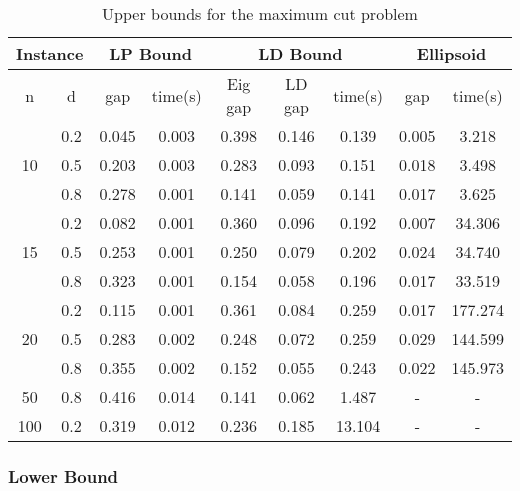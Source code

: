 \documentclass[12pt]{article}
\theoremstyle{plain}
\theoremstyle{definition}
\begin{document}
\begin{table}[h]
	\small
	\centering
	\begin{tabular}{cc|cc|ccc|cc}
		\hline
		\multicolumn{2}{c|}{Instance} & \multicolumn{2}{c|}{LP Bound} & \multicolumn{3}{c|}{LD Bound} & \multicolumn{2}{c}{Ellipsoid} \\ \hline
		n                     & d     & gap          & time(s)        & Eig gap  & LD gap  & time(s)  & gap          & time(s)        \\ \hline
		\multirow{3}{*}{10}   & 0.2   & 0.045        & 0.003          & 0.398    & 0.146   & 0.139    & 0.005        & 3.218          \\
		& 0.5   & 0.203        & 0.003          & 0.283    & 0.093   & 0.151    & 0.018        & 3.498          \\
		& 0.8   & 0.278        & 0.001          & 0.141    & 0.059   & 0.141    & 0.017        & 3.625          \\ \hline
		\multirow{3}{*}{15}   & 0.2   & 0.082        & 0.001          & 0.360    & 0.096   & 0.192    & 0.007        & 34.306         \\
		& 0.5   & 0.253        & 0.001          & 0.250    & 0.079   & 0.202    & 0.024        & 34.740         \\
		& 0.8   & 0.323        & 0.001          & 0.154    & 0.058   & 0.196    & 0.017        & 33.519         \\ \hline
		\multirow{3}{*}{20}   & 0.2   & 0.115        & 0.001          & 0.361    & 0.084   & 0.259    & 0.017        & 177.274        \\
		& 0.5   & 0.283        & 0.002          & 0.248    & 0.072   & 0.259    & 0.029        & 144.599        \\
		& 0.8   & 0.355        & 0.002          & 0.152    & 0.055   & 0.243    & 0.022        & 145.973        \\ \hline
		50                    & 0.8   & 0.416        & 0.014          & 0.141    & 0.062   & 1.487    & -            & -              \\ \hline
		100                   & 0.2   & 0.319        & 0.012          & 0.236    & 0.185   & 13.104   & -            & -              \\ \hline
	\end{tabular}
	\caption{Upper bounds for the maximum cut problem}
	\label{tab:UB}
\end{table}
\subsubsection{Lower Bound}
\end{document}
